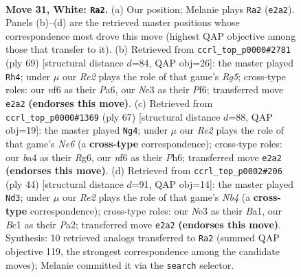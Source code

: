 \documentclass[11pt]{article}
\begin{document}
\clearpage

\begin{figure}[p]\centering
\begin{subfigure}{0.46\textwidth}\centering
\resizebox{\linewidth}{!}{%
\newchessgame
\chessboard[
  setfen={1n3r1k/6b1/BP3n2/p7/b1P5/4NpP1/4R3/1RB3K1 w - - 0 31},
  showmover=false,
  pgfstyle=straightmove, color=movearrow, markmove={e2-a2}
]}
\caption{}
\end{subfigure}\hfill
\begin{subfigure}{0.46\textwidth}\centering
\resizebox{\linewidth}{!}{%
\newchessgame
\chessboard[
  setfen={1k6/1p1r3p/p4p2/3b4/6r1/1N2B2B/1P3R1K/8 b - - 1 35},
  showmover=false,
  pgfstyle=straightmove, color=movearrow, markmove={g4-h4}
]}
\caption{}
\end{subfigure}
\\[4pt]
\begin{subfigure}{0.46\textwidth}\centering
\resizebox{\linewidth}{!}{%
\newchessgame
\chessboard[
  setfen={1k1r4/2pn4/6rp/8/3P3P/3Rnp2/P2N1B2/2K1R3 b - - 0 34},
  showmover=false,
  pgfstyle=straightmove, color=movearrow, markmove={e3-g4}
]}
\caption{}
\end{subfigure}\hfill
\begin{subfigure}{0.46\textwidth}\centering
\resizebox{\linewidth}{!}{%
\newchessgame
\chessboard[
  setfen={8/pp3kpp/4b3/8/1Nr1n3/5K2/P4PPP/B6R w - - 2 23},
  showmover=false,
  pgfstyle=straightmove, color=movearrow, markmove={b4-d3}
]}
\caption{}
\end{subfigure}
\caption{\textbf{Move 31, White: \texttt{Ra2}.} (a) Our position; Melanie plays \texttt{Ra2} (\texttt{e2a2}). Panels (b)--(d) are the retrieved master positions whose correspondence most drove this move (highest QAP objective among those that transfer to it). (b) Retrieved from \texttt{ccrl\_top\_p0000\#2781} (ply 69) [structural distance $d$=84, QAP obj=26]: the master played \texttt{Rh4}; under $\mu$ our \emph{Re2} plays the role of that game's \emph{Rg5}; cross-type roles: our \emph{n}f6 as their \emph{P}a6, our \emph{N}e3 as their \emph{P}f6; transferred move \texttt{e2a2} \textbf{(endorses this move)}. (c) Retrieved from \texttt{ccrl\_top\_p0000\#1369} (ply 67) [structural distance $d$=88, QAP obj=19]: the master played \texttt{Ng4}; under $\mu$ our \emph{Re2} plays the role of that game's \emph{Ne6} (a \textbf{cross-type} correspondence); cross-type roles: our \emph{b}a4 as their \emph{R}g6, our \emph{n}f6 as their \emph{P}h6; transferred move \texttt{e2a2} \textbf{(endorses this move)}. (d) Retrieved from \texttt{ccrl\_top\_p0002\#206} (ply 44) [structural distance $d$=91, QAP obj=14]: the master played \texttt{Nd3}; under $\mu$ our \emph{Re2} plays the role of that game's \emph{Nb4} (a \textbf{cross-type} correspondence); cross-type roles: our \emph{N}e3 as their \emph{B}a1, our \emph{B}c1 as their \emph{P}a2; transferred move \texttt{e2a2} \textbf{(endorses this move)}. Synthesis: 10 retrieved analogs transferred to \texttt{Ra2} (summed QAP objective 119, the strongest correspondence among the candidate moves); Melanie committed it via the \texttt{search} selector.}
\label{fig:thought-m60}
\end{figure}
\end{document}
